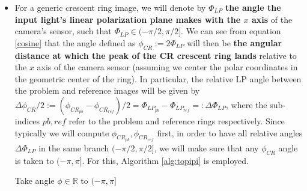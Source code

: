 \documentclass[11pt, a4paper, twoside]{article} %
\newcommand{\R}{\mathbb{R}} %
\begin{document}
\begin{itemize}
\item For a generic crescent ring image, we will denote by $\Phi_{LP}$ {\bf the angle the input light's linear polarization plane makes with the $x$ axis} of the camera's sensor, such that $\Phi_{LP}\in(-\pi/2,\pi/2]$. We can see from equation \eqref{cosine} that the angle defined as $\phi_{CR}:=2\Phi_{LP}$ will then be {\bf the angular distance at which the peak of the CR crescent ring lands} relative to the $x$ axis of the camera sensor (assuming we center the polar coordinates in the geometric center of the ring). In particular, the relative LP angle between the problem and reference images will be given by $\Delta \phi_{CR}/2:=(\phi_{CR_{pb}}-\phi_{CR_{ref}})/2=\Phi_{LP_{pb}}-\Phi_{LP_{ref}}=:\Delta \Phi_{LP}$, where the sub-indices $pb,ref$ refer to the problem and reference rings respectively. Since typically we will compute $\phi_{CR_{pb}},\phi_{CR_{ref}}$ first, in order to have all relative angles $\Delta \Phi_{LP}$ in the same branch $(-\pi/2,\pi/2]$, we will make sure that any $\phi_{CR}$ angle is taken to $(-\pi,\pi]$. For this, Algorithm \ref{alg:topipi} is employed.\vspace{-0.02cm}

\begin{algorithm}
{\small \caption{ \rule{0pt}{3mm}{}Take angle $\phi\in\R$ to $(-\pi,\pi]$}\label{alg:topipi}
\Given{ $\phi\ :$}{
$\phi\gets \phi\ mod\ (2\pi)$\Comment*[r]{Take it to (-2pi,2pi)}
\uIf{abs(\ $\phi$\ )$\ >\pi$}{{\bf return } $\phi-$sign$(\phi)\cdot 2\pi$\;}
\uElse{{\bf return }$\phi $ \Comment*[r]{Already in (-pi,pi)}}}}
\end{algorithm}


\end{itemize}
\end{document}
